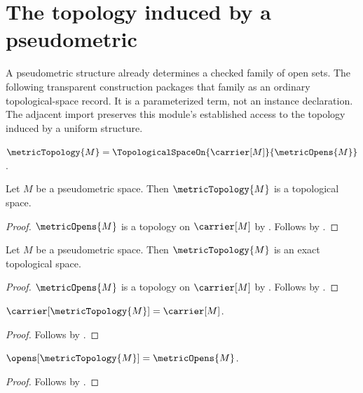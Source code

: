 


\section{The topology induced by a pseudometric}

A pseudometric structure already determines a checked family of open sets.
The following transparent construction packages that family as an ordinary
topological-space record.  It is a parameterized term, not an instance
declaration.  The adjacent import preserves this module's established access
to the topology induced by a uniform structure.

\begin{definition}\label{metric_topology}
    $\metricTopology{M}=
        \TopologicalSpaceOn{\carrier[M]}{\metricOpens{M}}$.
\end{definition}

\begin{theorem}\label{metric_topology_is_topological_space}
    Let $M$ be a pseudometric space.
    Then $\metricTopology{M}$ is a topological space.
\end{theorem}
\begin{proof}
    $\metricOpens{M}$ is a topology on $\carrier[M]$
        by .
    Follows by
        .
\end{proof}

\begin{theorem}\label{metric_topology_is_exact}
    Let $M$ be a pseudometric space.
    Then $\metricTopology{M}$ is an exact topological space.
\end{theorem}
\begin{proof}
    $\metricOpens{M}$ is a topology on $\carrier[M]$ by
        .
    Follows by .
\end{proof}

\begin{proposition}\label{metric_topology_carrier}
    $\carrier[\metricTopology{M}]=\carrier[M]$.
\end{proposition}
\begin{proof}
    Follows by
        .
\end{proof}

\begin{proposition}\label{metric_topology_opens}
    $\opens[\metricTopology{M}]=\metricOpens{M}$.
\end{proposition}
\begin{proof}
    Follows by
        .
\end{proof}
